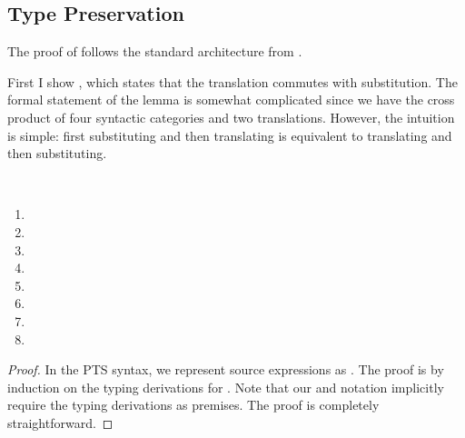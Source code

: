 \subsection{Type Preservation}
\label{sec:cps:cbn:proof}
{
\allowdisplaybreaks
The proof of  follows the standard architecture from
.

First I show , which states that the \cbnname{}
translation commutes with substitution.
The formal statement of the lemma is somewhat complicated since we have the
cross product of four syntactic categories and two translations.
However, the intuition is simple: first substituting and then translating is
equivalent to translating and then substituting.

\begin{lemma}
  \label{lem:cps:cbn:subst}
  ~
  \begin{multicols}{2}
  \begin{enumerate}
    \item \im{(\subst{\sK}{\sA}{\salpha})^{+} \equiv \subst{\sK^{+}}{\sA^{+}}{\cpsalpha}}
    \item \im{(\subst{\sK}{\se}{\sx})^{+} \equiv \subst{\sK^{+}}{\se^{\div}}{\cpsx}}
    \item \im{(\subst{\sA}{\sB}{\salpha})^{+} \equiv \subst{\sA^{+}}{\sB^{+}}{\cpsalpha}}
    \item \im{(\subst{\sA}{\se}{\sx})^{+} \equiv \subst{\sA^{+}}{\se^{\div}}{\cpsx}}
    \item \im{(\subst{\sA}{\sB}{\salpha})^{\div} \equiv \subst{\sA^{\div}}{\sB^{+}}{\cpsalpha}}
    \item \im{(\subst{\sA}{\se}{\sx})^{\div} \equiv \subst{\sA^{\div}}{\se^{\div}}{\cpsx}}
    \item \im{(\subst{\se}{\sA}{\salpha})^{\div} \equiv \subst{\se^{\div}}{\sA^{+}}{\cpsalpha}}
    \item \im{(\subst{\se}{\sepr}{\sx})^{\div} \equiv \subst{\se^{\div}}{\se^{\sprime\div}}{\cpsx}}
  \end{enumerate}
  \end{multicols}
\end{lemma}
\begin{proof}
  In the PTS syntax, we represent source expressions as \im{\subst{\st}{\stpr}{\sx}}.
  The proof is by induction on the typing derivations for \im{\st}.
  Note that our \im{^\div} and \im{^+} notation implicitly require the typing derivations as
  premises.
  The proof is completely straightforward.

\end{proof}}
